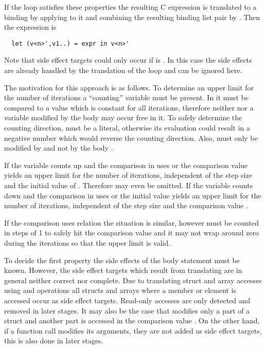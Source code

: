 If the loop satisfies these properties the resulting C expression  is translated to a binding  
by applying  to it and combining the resulting binding list pair by . Then the expression
 is
\begin{verbatim}
  let (v<n>',v1..) = expr in v<n>'
\end{verbatim}
Note that side effect targets  could only occur if  is . In this case the side effects are already
handled by the translation of the loop and can be ignored here.

The motivation for this approach is as follows. To determine an upper limit for the number of iterations a ``counting'' variable
 must be present. In  it must be compared to a value  which is constant for all iterations, therefore neither 
 nor a variable modified by the body may occur free in it. To safely determine the counting direction,  must 
be a literal, otherwise its evaluation could result in a negative number which would reverse the counting direction. Also,
 must only be modified by  and not by the body .

If the variable counts up and the comparison in  uses \code{<} or \code{<=} the comparison value  yields 
an upper limit for the number of iterations, independent of the step size and the initial value of . Therefore 
may even be omitted. If the variable counts down and the comparison in  uses \code{>} or \code{>=} the initial value 
 yields an upper limit for the number of iterations, independent of the step size and the comparison value .

If the comparison uses relation \code{!=} the situation is similar, however  must be counted in steps of 1 to safely
hit the comparison value and it may not wrap around zero during the iterations so that the upper limit is valid.

To decide the first property the side effects of the body statement  must be known. However, the side effect targets
 which result from translating  are in general neither correct nor complete. Due to translating struct and array 
accesses using  and  operations all structs and arrays where a member or element is accessed occur as side
effect targets. Read-only accesses are only detected and removed in later stages. It may also be the case that  modifies 
only a part of a struct and another part is accessed in the comparison value . On the other hand, if a function call 
modifies its arguments, they are not added as side effect targets, this is also done in later stages. 

